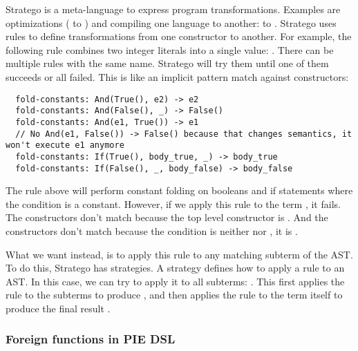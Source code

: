 Stratego is a meta-language to express program transformations.
Examples are optimizations ( to ) and compiling one language to another:  to .
Stratego uses rules to define transformations from one constructor to another.
For example, the following rule combines two integer literals into a single value: .
There can be multiple rules with the same name.
Stratego will try them until one of them succeeds or all failed.
This is like an implicit pattern match against constructors:
\begin{lstlisting}
  fold-constants: And(True(), e2) -> e2
  fold-constants: And(False(), _) -> False()
  fold-constants: And(e1, True()) -> e1
  // No And(e1, False()) -> False() because that changes semantics, it won't execute e1 anymore
  fold-constants: If(True(), body_true, _) -> body_true
  fold-constants: If(False(), _, body_false) -> body_false
\end{lstlisting}

The  rule above will perform constant folding on booleans and if statements where the condition is a constant.
However, if we apply this rule to the term , it fails.
The  constructors don't match because the top level constructor is .
And the  constructors don't match because the condition is neither  nor , it is .

What we want instead, is to apply this rule to any matching subterm of the \ac{AST}.
To do this, Stratego has strategies.
A strategy defines how to apply a rule to an \ac{AST}.
In this case, we can try to apply it to all subterms: .
This first applies the rule to the subterms to produce , and then applies the rule to the term itself to produce the final result .

\subsubsection{Foreign functions in \ac{PIE} \ac{DSL}}
\label{subsubsec:problem_analysis__background__foreign_functions}

